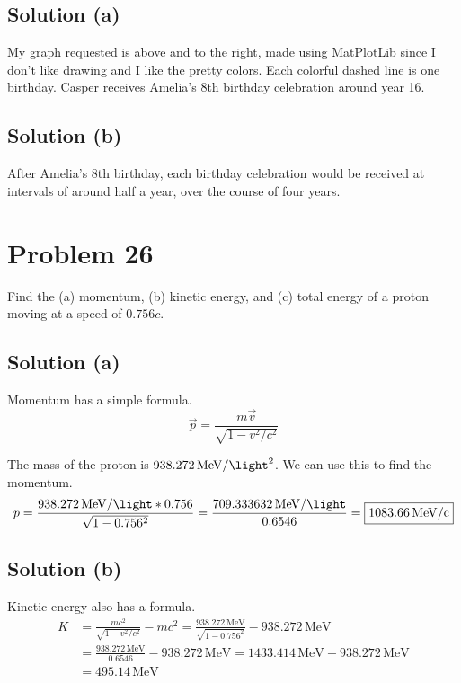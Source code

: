 \documentclass[12pt]{article}
\begin{document}
    \subsection{Solution (a)}
        My graph requested is above and to the right, made using MatPlotLib since I don't like drawing and I like the pretty colors.
        Each colorful dashed line is one birthday.
        Casper receives Amelia's 8th birthday celebration around year 16. 

    \subsection{Solution (b)}
        After Amelia's 8th birthday, each birthday celebration would be received at intervals of around half a year, over the course of four years.

    \pagebreak

\section{Problem 26} %
    Find the (a) momentum, (b) kinetic energy, and (c) total energy of a proton moving at a speed of $0.756c$.

    \subsection{Solution (a)}
        Momentum has a simple formula.
        \begin{equation}
            \vec{p} = \frac{m\vec{v}}{\sqrt{1 - v^2/c^2}}
        \end{equation}

        The mass of the proton is $938.272\,\unit{\mega\eV/\light^2}$.
        We can use this to find the momentum.
        \begin{equation}
            p   =   \frac{938.272\,\unit{\mega\eV/\light} * 0.756}{\sqrt{1 - 0.756^2}}
                =   \frac{709.333632\,\unit{\mega\eV/\light}}{0.6546}
                =   \boxed{1083.66\,\unit{\mega\eV/c}}
        \end{equation}

    \subsection{Solution (b)}
        Kinetic energy also has a formula.
        \begin{align}
            K   &=  \frac{mc^2}{\sqrt{1 - v^2/c^2}} - mc^2
                =   \frac{938.272\,\unit{\mega\eV}}{\sqrt{1 - 0.756^2}} - 938.272\,\unit{\mega\eV}\\
                &=  \frac{938.272\,\unit{\mega\eV}}{0.6546} - 938.272\,\unit{\mega\eV}
                =   1433.414\,\unit{\mega\eV} - 938.272\,\unit{\mega\eV}\\
                &=  \boxed{495.14\,\unit{\mega\eV}}
        \end{align}
\end{document}
